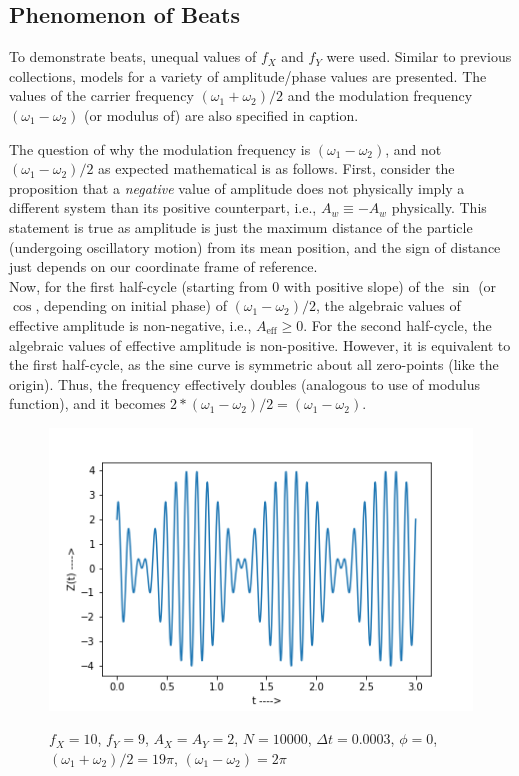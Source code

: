 \documentclass{report}
\begin{document}
\subsection*{Phenomenon of Beats}
To demonstrate beats, unequal values of $f_X$ and $f_Y$ were used. Similar to previous collections, models for a variety of amplitude/phase values are presented. The values of the carrier frequency $(\omega_1+\omega_2)/2$ and the modulation frequency $(\omega_1-\omega_2)$ (or modulus of) are also specified in caption.

The question of why the modulation frequency is $(\omega_1-\omega_2)$, and not $(\omega_1-\omega_2)/2$ as expected mathematical is as follows. First, consider the proposition that a \emph{negative} value of amplitude does not physically imply a different system than its positive counterpart, i.e., $A_w \equiv -A_w$ physically. This statement is true as amplitude is just the maximum distance of the particle (undergoing oscillatory motion) from its mean position, and the sign of distance just depends on our coordinate frame of reference.\\ 
Now, for the first half-cycle (starting from 0 with positive slope) of the $\sin$ (or $\cos$, depending on initial phase) of $(\omega_1-\omega_2)/2$, the  algebraic values of effective amplitude is non-negative, i.e., $A_{\text{eff}}\geq 0$. For the second half-cycle, the algebraic values of effective amplitude is non-positive. However, it is equivalent to the first half-cycle, as the sine curve is symmetric about all zero-points (like the origin). Thus, the frequency effectively doubles (analogous to use of modulus function), and it becomes $2*(\omega_1-\omega_2)/2=(\omega_1-\omega_2)$.
\begin{figure}[H]
	\centering
	\includegraphics[width = \textwidth]{beats1.png}
	\label{beats1}
	\caption{$f_X=10$, $f_Y=9$, $A_X=A_Y=2$, $N=10000$, $\Delta t=0.0003$, $\phi=0$, $(\omega_1+\omega_2)/2=19\pi$, $(\omega_1-\omega_2)=2\pi$}
\end{figure}  
\end{document}
